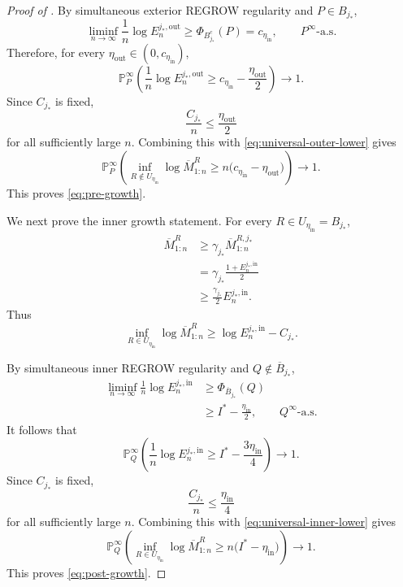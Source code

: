 \documentclass[12pt]{article}
\theoremstyle{spaced}
\theoremstyle{remark}
\begin{document}
\begin{proof}[Proof of ]
By simultaneous exterior REGROW regularity and
$P\in B_{j_*}$,
\[
    \liminf_{n\to\infty}
    \frac1n\log E_n^{j_*,\mathrm{out}}
    \ge
    \Phi_{B_{j_*}^c}(P)
    =
    c_{\eta_{\mathrm{in}}},
    \qquad
    P^\infty\text{-a.s.}
\]
Therefore, for every
$\eta_{\mathrm{out}}\in(0,c_{\eta_{\mathrm{in}}})$,
\[
    \mathbb P_P^\infty
    \left(
        \frac1n
        \log E_n^{j_*,\mathrm{out}}
        \ge
        c_{\eta_{\mathrm{in}}}
        -
        \frac{\eta_{\mathrm{out}}}{2}
    \right)
    \longrightarrow1.
\]
Since $C_{j_*}$ is fixed,
\[
    \frac{C_{j_*}}{n}
    \le
    \frac{\eta_{\mathrm{out}}}{2}
\]
for all sufficiently large $n$. Combining this with
\eqref{eq:universal-outer-lower} gives
\[
    \mathbb P_P^\infty
    \left(
        \inf_{R\notin U_{\eta_{\mathrm{in}}}}
        \log\overline M_{1:n}^{R}
        \ge
        n\bigl(
            c_{\eta_{\mathrm{in}}}
            -
            \eta_{\mathrm{out}}
        \bigr)
    \right)
    \longrightarrow1.
\]
This proves \eqref{eq:pre-growth}.

We next prove the inner growth statement. For every
$R\in U_{\eta_{\mathrm{in}}}=B_{j_*}$,
\[
\begin{aligned}
    \overline M_{1:n}^{R}
    &\ge
    \gamma_{j_*}
    \overline M_{1:n}^{R,j_*}\\
    &=
    \gamma_{j_*}
    \frac{1+E_n^{j_*,\mathrm{in}}}{2}\\
    &\ge
    \frac{\gamma_{j_*}}{2}
    E_n^{j_*,\mathrm{in}}.
\end{aligned}
\]
Thus
\begin{equation}
\label{eq:universal-inner-lower}
    \inf_{R\in U_{\eta_{\mathrm{in}}}}
    \log\overline M_{1:n}^{R}
    \ge
    \log E_n^{j_*,\mathrm{in}}
    -
    C_{j_*}.
\end{equation}

By simultaneous inner REGROW regularity and
$Q\notin\overline B_{j_*}$,
\[
\begin{aligned}
    \liminf_{n\to\infty}
    \frac1n\log E_n^{j_*,\mathrm{in}}
    &\ge
    \Phi_{\overline B_{j_*}}(Q)\\
    &\ge
    I^*-\frac{\eta_{\mathrm{in}}}{2},
    \qquad
    Q^\infty\text{-a.s.}
\end{aligned}
\]
It follows that
\[
    \mathbb P_Q^\infty
    \left(
        \frac1n\log E_n^{j_*,\mathrm{in}}
        \ge
        I^*-\frac{3\eta_{\mathrm{in}}}{4}
    \right)
    \longrightarrow1.
\]
Since $C_{j_*}$ is fixed,
\[
    \frac{C_{j_*}}{n}
    \le
    \frac{\eta_{\mathrm{in}}}{4}
\]
for all sufficiently large $n$. Combining this with
\eqref{eq:universal-inner-lower} gives
\[
    \mathbb P_Q^\infty
    \left(
        \inf_{R\in U_{\eta_{\mathrm{in}}}}
        \log\overline M_{1:n}^{R}
        \ge
        n\bigl(I^*-\eta_{\mathrm{in}}\bigr)
    \right)
    \longrightarrow1.
\]
This proves \eqref{eq:post-growth}.


\end{proof}
\end{document}
